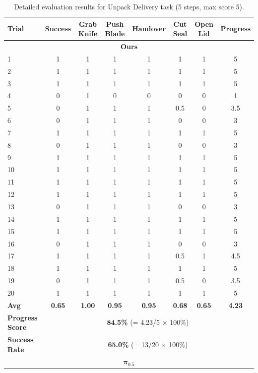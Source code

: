\documentclass[onecolumn]{robbyant}           %
\begin{document}
\begin{table}[t]
\centering
\caption{Detailed evaluation results for Unpack Delivery task (5 steps, max score 5).}
\label{tab:realworld_detailed_unpack_delivery}
\scriptsize
\begin{tabular}{l|c|ccccc|c}
\toprule
\textbf{Trial} & \textbf{Success} & \textbf{Grab Knife} & \textbf{Push Blade} & \textbf{Handover} & \textbf{Cut Seal} & \textbf{Open Lid} & \textbf{Progress} \\
\midrule
\multicolumn{8}{c}{\textbf{Ours}} \\
\midrule
1  & 1 & 1 & 1 & 1 & 1 & 1 & 5 \\
2  & 1 & 1 & 1 & 1 & 1 & 1 & 5 \\
3  & 1 & 1 & 1 & 1 & 1 & 1 & 5 \\
4  & 0 & 1 & 0 & 0 & 0 & 0 & 1 \\
5  & 0 & 1 & 1 & 1 & 0.5 & 0 & 3.5 \\
6  & 0 & 1 & 1 & 1 & 0 & 0 & 3 \\
7  & 1 & 1 & 1 & 1 & 1 & 1 & 5 \\
8  & 0 & 1 & 1 & 1 & 0 & 0 & 3 \\
9  & 1 & 1 & 1 & 1 & 1 & 1 & 5 \\
10 & 1 & 1 & 1 & 1 & 1 & 1 & 5 \\
11 & 1 & 1 & 1 & 1 & 1 & 1 & 5 \\
12 & 1 & 1 & 1 & 1 & 1 & 1 & 5 \\
13 & 0 & 1 & 1 & 1 & 0 & 0 & 3 \\
14 & 1 & 1 & 1 & 1 & 1 & 1 & 5 \\
15 & 1 & 1 & 1 & 1 & 1 & 1 & 5 \\
16 & 0 & 1 & 1 & 1 & 0 & 0 & 3 \\
17 & 1 & 1 & 1 & 1 & 0.5 & 1 & 4.5 \\
18 & 1 & 1 & 1 & 1 & 1 & 1 & 5 \\
19 & 0 & 1 & 1 & 1 & 0.5 & 0 & 3.5 \\
20 & 1 & 1 & 1 & 1 & 1 & 1 & 5 \\
\midrule
\textbf{Avg} & \textbf{0.65} & \textbf{1.00} & \textbf{0.95} & \textbf{0.95} & \textbf{0.68} & \textbf{0.65} & \textbf{4.23} \\
\textbf{Progress Score} & \multicolumn{7}{c}{\textbf{84.5\%} (= 4.23/5 $\times$ 100\%)} \\
\textbf{Success Rate} & \multicolumn{7}{c}{\textbf{65.0\%} (= 13/20 $\times$ 100\%)} \\
\midrule
\multicolumn{8}{c}{$\boldsymbol{\pi_{0.5}}$} \\

\end{tabular}
\end{table}
\end{document}
